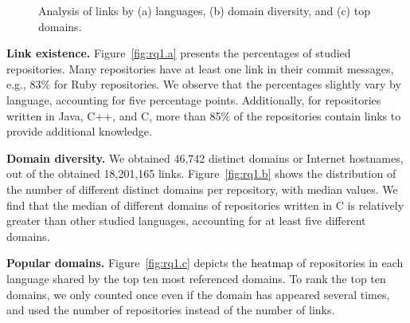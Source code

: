 \documentclass[smallextended]{svjour3}       %
\newcommand{\fix}[1]{\textcolor{black}{#1}}
\begin{document}
\begin{figure}[t]
\begin{minipage}[b][]{\textwidth}
    \end{minipage}
    \caption{Analysis of links by (a) languages, (b) domain diversity, and (c) top domains.}
    \label{fig:rq1}
    \end{figure}
    
\textbf{Link existence.}
Figure~\ref{fig:rq1.a} presents the percentages of studied repositories. Many repositories have at least one link in their commit messages, e.g., 83\% for Ruby repositories. We observe that the percentages slightly vary by language, accounting for five percentage points. Additionally, for repositories written in Java, C++, and C, more than 85\% of the repositories contain links to provide additional knowledge.

\textbf{Domain diversity.}
We obtained 46,742 distinct domains or Internet hostnames, out of the obtained 18,201,165 links. Figure~\ref{fig:rq1.b} shows the distribution of the number of different distinct domains per repository, with median values. We find that the median of different domains of repositories written in C is relatively greater than other studied languages, accounting for at least five different domains.

\textbf{Popular domains.} Figure~\ref{fig:rq1.c} depicts the \fix{heatmap} of repositories in each language shared by the top ten most referenced domains. To rank the top ten domains, we only counted once even if the domain has appeared several times, and used the number of repositories instead of the number of links.
\end{document}
